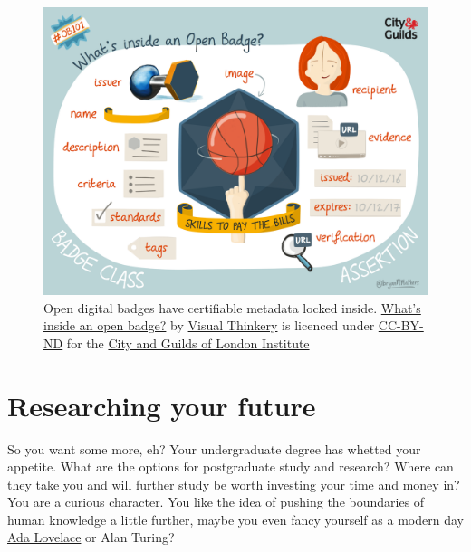 \documentclass[
]{book}
\begin{document}
\begin{figure}

{\centering \includegraphics[width=1\linewidth]{images/skills-to-pay-the-bills} 

}

\caption{Open digital badges have certifiable metadata locked inside. \href{https://bryanmmathers.com/whats-inside-an-open-badge/}{What's inside an open badge?} by \href{https://visualthinkery.com/}{Visual Thinkery} is licenced under \href{https://creativecommons.org/licenses/by-nd/4.0/}{CC-BY-ND} for the \href{https://en.wikipedia.org/wiki/City_and_Guilds_of_London_Institute}{City and Guilds of London Institute}}\label{fig:skills-bills-fig}
\end{figure}



\hypertarget{researching}{%
\chapter{Researching your future}\label{researching}}

So you want some more, eh? Your undergraduate degree has whetted your appetite. What are the options for postgraduate study and research? Where can they take you and will further study be worth investing your time and money in? You are a curious character. You like the idea of pushing the boundaries of human knowledge a little further, maybe you even fancy yourself as a modern day \href{https://en.wikipedia.org/wiki/Ada_Lovelace}{Ada Lovelace} or Alan Turing? 👩‍🔬👨‍🔬
\end{document}
